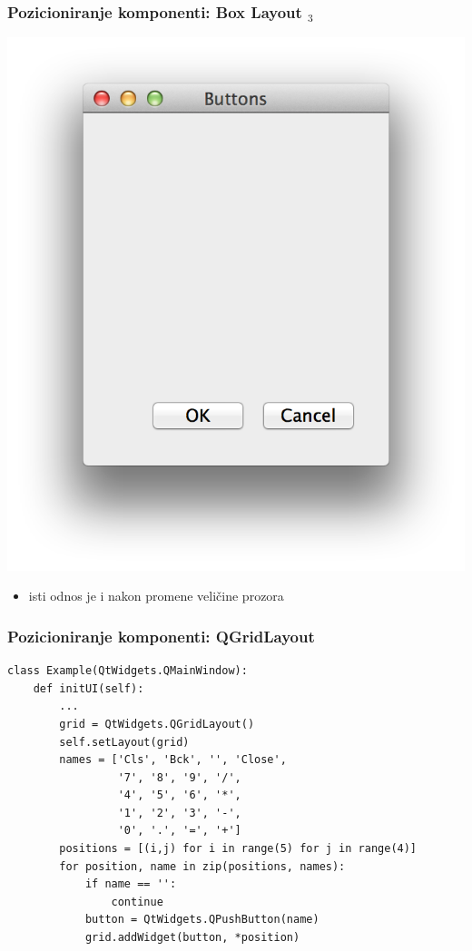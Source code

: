 \documentclass[utf8,compress,aspectratio=169]{beamer}
\begin{document}
\begin{frame}[fragile]
  \frametitle{Pozicioniranje komponenti: Box Layout $_3$}
\begin{center}
\includegraphics[scale=0.4]{pyqt07.png}
\end{center}
  \begin{itemize}
    \item isti odnos je i nakon promene veličine prozora
  \end{itemize}
\end{frame}

\begin{frame}[fragile,shrink=8]
  \frametitle{Pozicioniranje komponenti: QGridLayout}
\begin{verbatim}
class Example(QtWidgets.QMainWindow):
    def initUI(self):
        ...
        grid = QtWidgets.QGridLayout()
        self.setLayout(grid)
        names = ['Cls', 'Bck', '', 'Close',
                 '7', '8', '9', '/',
                 '4', '5', '6', '*',
                 '1', '2', '3', '-',
                 '0', '.', '=', '+']
        positions = [(i,j) for i in range(5) for j in range(4)]
        for position, name in zip(positions, names):
            if name == '':
                continue
            button = QtWidgets.QPushButton(name)
            grid.addWidget(button, *position)
\end{verbatim}
\end{frame}
\end{document}
